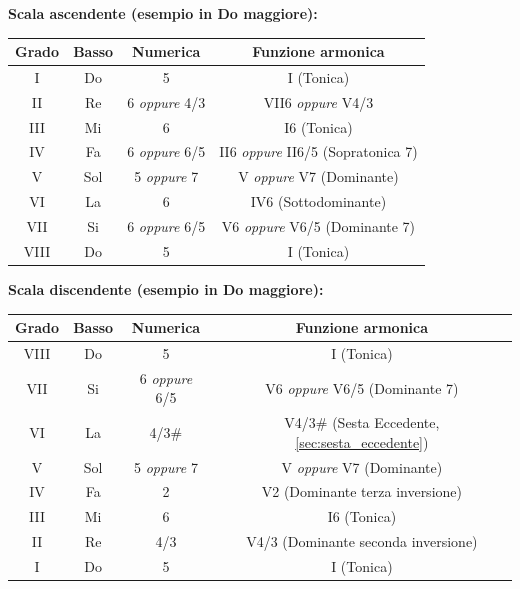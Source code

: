 \begin{regola}
	\label{reg:regola_ottava_completa_maggiore}
	
	\textbf{Scala ascendente (esempio in Do maggiore):}
	
	\begin{tabular}{|c|c|c|c|}
		\hline
		\textbf{Grado} & \textbf{Basso} & \textbf{Numerica} & \textbf{Funzione armonica} \\
		\hline
		I & Do & 5 & I (Tonica) \\
		II & Re & 6 \textit{oppure} 4/3 & VII6 \textit{oppure} V4/3 \\
		III & Mi & 6 & I6 (Tonica) \\
		IV & Fa & 6 \textit{oppure} 6/5 & II6 \textit{oppure} II6/5 (Sopratonica 7) \\
		V & Sol & 5 \textit{oppure} 7 & V \textit{oppure} V7 (Dominante) \\
		VI & La & 6 & IV6 (Sottodominante) \\
		VII & Si & 6 \textit{oppure} 6/5 & V6 \textit{oppure} V6/5 (Dominante 7) \\
		VIII & Do & 5 & I (Tonica) \\
		\hline
	\end{tabular}
	
	\vspace{0.5cm}
	
	\textbf{Scala discendente (esempio in Do maggiore):}
	
	\begin{tabular}{|c|c|c|c|}
		\hline
		\textbf{Grado} & \textbf{Basso} & \textbf{Numerica} & \textbf{Funzione armonica} \\
		\hline
		VIII & Do & 5 & I (Tonica) \\
		VII & Si & 6 \textit{oppure} 6/5 & V6 \textit{oppure} V6/5 (Dominante 7) \\
		VI & La & 4/3\# & V4/3\# (Sesta Eccedente, \ref{sec:sesta_eccedente}) \\
		V & Sol & 5 \textit{oppure} 7 & V \textit{oppure} V7 (Dominante) \\
		IV & Fa & 2 & V2 (Dominante terza inversione) \\
		III & Mi & 6 & I6 (Tonica) \\
		II & Re & 4/3 & V4/3 (Dominante seconda inversione) \\
		I & Do & 5 & I (Tonica) \\
		\hline
	\end{tabular}
\end{regola}

